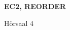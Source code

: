 \documentclass[a4paper]{article}
\begin{document}
\printGenericVSLHeader
\begin{center}
\begin{vsltext}{3cm}{4cm}

   \vspace{0.5cm} 

    \textbf{EC2, REORDER} 

    \vspace{1.5cm}

    Hörsaal 4

\end{vsltext}

\end{center}
\end{document}
